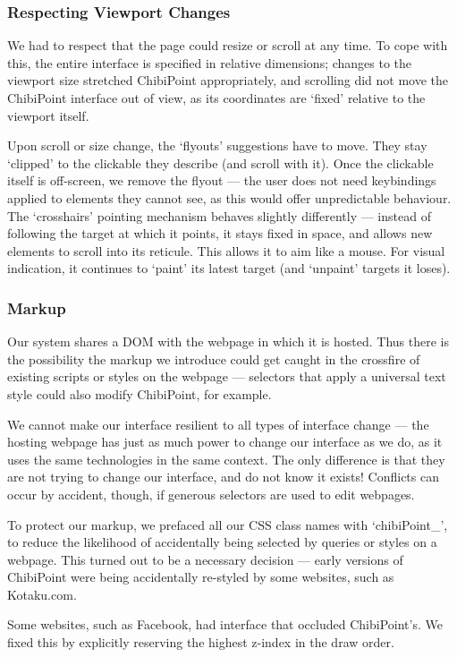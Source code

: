 \documentclass[11pt,openright,a4paper]{report}
\begin{document}
\subsubsection{Respecting Viewport Changes}
We had to respect that the page could resize or scroll at any time. To cope with this, the entire interface is specified in relative dimensions; changes to the viewport size stretched ChibiPoint appropriately, and scrolling did not move the ChibiPoint interface out of view, as its coordinates are `fixed' relative to the viewport itself.

Upon scroll or size change, the `flyouts' suggestions have to move. They stay `clipped' to the clickable they describe (and scroll with it). Once the clickable itself is off-screen, we remove the flyout --- the user does not need keybindings applied to elements they cannot see, as this would offer unpredictable behaviour. The `crosshairs' pointing mechanism behaves slightly differently --- instead of following the target at which it points, it stays fixed in space, and allows new elements to scroll into its reticule. This allows it to aim like a mouse. For visual indication, it continues to `paint' its latest target (and `unpaint' targets it loses).

\subsubsection{Markup}
Our system shares a DOM with the webpage in which it is hosted. Thus there is the possibility the markup we introduce could get caught in the crossfire of existing scripts or styles on the webpage --- selectors that apply a universal text style could also modify ChibiPoint, for example.

We cannot make our interface resilient to all types of interface change --- the hosting webpage has just as much power to change our interface as we do, as it uses the same technologies in the same context. The only difference is that they are not trying to change our interface, and do not know it exists! Conflicts can occur by accident, though, if generous selectors are used to edit webpages.

To protect our markup, we prefaced all our CSS class names with `chibiPoint\_', to reduce the likelihood of accidentally being selected by queries or styles on a webpage. This turned out to be a necessary decision --- early versions of ChibiPoint were being accidentally re-styled by some websites, such as Kotaku.com.

Some websites, such as Facebook, had interface that occluded ChibiPoint's. We fixed this by explicitly reserving the highest z-index in the draw order.
\end{document}

